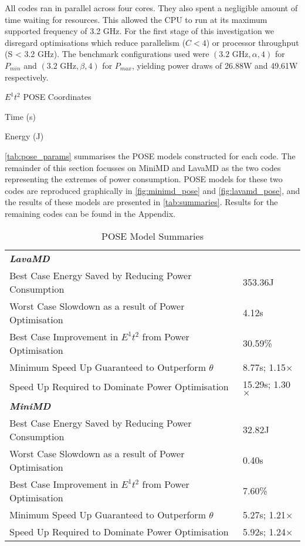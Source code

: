 All codes ran in parallel across four cores.
They also spent a negligible amount of time waiting for resources. 
This allowed the CPU to run at its maximum supported frequency of 3.2 GHz.
For the first stage of this investigation we disregard optimisations which reduce parallelism ($C < 4$) or processor throughput (S < 3.2 GHz).
The benchmark configurations used were $(\text{3.2 GHz}, \alpha, 4)$ for $P_{min}$ and $(\text{3.2 GHz}, \beta, 4)$ for $P_{max}$, yielding power draws of 26.88W and 49.61W respectively.

\begin{table}
  \setlength{\tabcolsep}{.5em}
  \scriptsize
  \caption{$E^1t^2$ POSE Coordinates}
  \begin{subtable}{\linewidth}
  \centering
  \caption{Time (s)}
  
  \end{subtable}
  \par\bigskip 
  \begin{subtable}{\linewidth}
  \centering
  \caption{Energy (J)}
  
  \end{subtable}
  \label{tab:pose_params}
\end{table}

\autoref{tab:pose_params} summarises the POSE models constructed for each code.
The remainder of this section focusses on MiniMD and LavaMD as the two codes representing the extremes of power consumption.
POSE models for these two codes are reproduced graphically in \autoref{fig:minimd_pose} and \autoref{fig:lavamd_pose}, and the results of these models are presented in \autoref{tab:summaries}.
Results for the remaining codes can be found in the Appendix.

\begin{table}[h!]
\caption{POSE Model Summaries}
\label{tab:summaries}
\begin{tabular}{@{}ll@{}}\toprule
 \textbf{\emph{LavaMD}}&\\
 Best Case Energy Saved by Reducing Power Consumption & 353.36J \\
 Worst Case Slowdown as a result of Power Optimisation & 4.12s \\
 Best Case Improvement in $E^1t^2$ from Power Optimisation & 30.59\% \\
 Minimum Speed Up Guaranteed to Outperform $\theta$ & 8.77s; 1.15$\times$ \\
 Speed Up Required to Dominate Power Optimisation & 15.29s; 1.30$\times$ \\
 \rule{0pt}{2.5ex}\textbf{\textit{MiniMD}}& \\
 Best Case Energy Saved by Reducing Power Consumption & 32.82J \\
 Worst Case Slowdown as a result of Power Optimisation & 0.40s \\
 Best Case Improvement in $E^1t^2$ from Power Optimisation & 7.60\% \\
 Minimum Speed Up Guaranteed to Outperform $\theta$ & 5.27s; 1.21$\times$ \\
 Speed Up Required to Dominate Power Optimisation & 5.92s; 1.24$\times$ \\
\bottomrule
\end{tabular}
\end{table}

